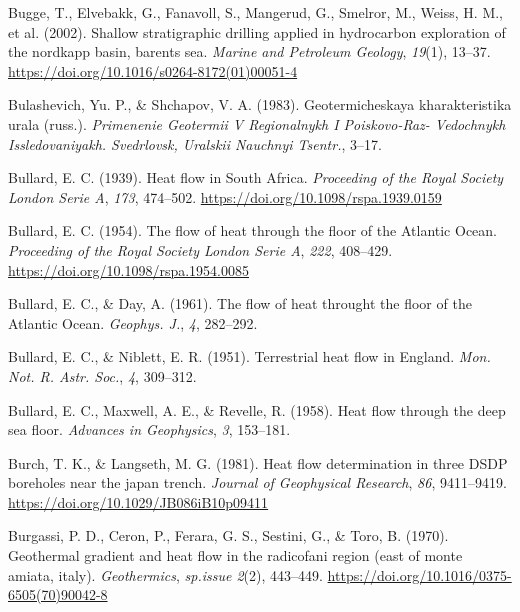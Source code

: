 \begin{CSLReferences}{1}{1}
\leavevmode{}%
Bugge, T., Elvebakk, G., Fanavoll, S., Mangerud, G., Smelror, M., Weiss, H. M., et al. (2002). Shallow stratigraphic drilling applied in hydrocarbon exploration of the nordkapp basin, barents sea. \emph{Marine and Petroleum Geology}, \emph{19}(1), 13--37. \url{https://doi.org/10.1016/s0264-8172(01)00051-4}

\leavevmode{}%
Bulashevich, Yu. P., \& Shchapov, V. A. (1983). Geotermicheskaya kharakteristika urala (russ.). \emph{Primenenie Geotermii V Regionalnykh I Poiskovo-Raz- Vedochnykh Issledovaniyakh. Svedrlovsk, Uralskii Nauchnyi Tsentr.}, 3--17.

\leavevmode{}%
Bullard, E. C. (1939). Heat flow in {South Africa}. \emph{Proceeding of the Royal Society London Serie A}, \emph{173}, 474--502. \url{https://doi.org/10.1098/rspa.1939.0159}

\leavevmode{}%
Bullard, E. C. (1954). The flow of heat through the floor of the {Atlantic Ocean}. \emph{Proceeding of the Royal Society London Serie A}, \emph{222}, 408--429. \url{https://doi.org/10.1098/rspa.1954.0085}

\leavevmode{}%
Bullard, E. C., \& Day, A. (1961). The flow of heat throught the floor of the {Atlantic Ocean}. \emph{Geophys. J.}, \emph{4}, 282--292.

\leavevmode{}%
Bullard, E. C., \& Niblett, E. R. (1951). Terrestrial heat flow in {England}. \emph{Mon. Not. R. Astr. Soc.}, \emph{4}, 309--312.

\leavevmode{}%
Bullard, E. C., Maxwell, A. E., \& Revelle, R. (1958). Heat flow through the deep sea floor. \emph{Advances in Geophysics}, \emph{3}, 153--181.

\leavevmode{}%
Burch, T. K., \& Langseth, M. G. (1981). Heat flow determination in three DSDP boreholes near the japan trench. \emph{Journal of Geophysical Research}, \emph{86}, 9411--9419. \url{https://doi.org/10.1029/JB086iB10p09411}

\leavevmode{}%
Burgassi, P. D., Ceron, P., Ferara, G. S., Sestini, G., \& Toro, B. (1970). Geothermal gradient and heat flow in the radicofani region (east of monte amiata, italy). \emph{Geothermics}, \emph{sp.issue 2}(2), 443--449. \url{https://doi.org/10.1016/0375-6505(70)90042-8}


\end{CSLReferences}
